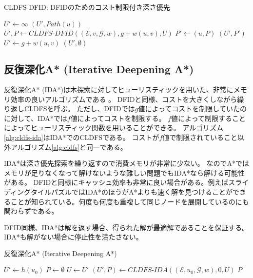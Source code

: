 \begin{algorithm}
\caption{CLDFS-DFID: DFIDのためのコスト制限付き深さ優先}
\label{alg:cldfs}
        $U' \leftarrow \infty$\;
	 {
		\Return $(U', Path(u))$\;
	}
	 {
		 {
			$U', P \leftarrow CLDFS\text{-}DFID((\mathcal{E}, v, \mathcal{G}, w), g + w(u, v), U)$\;
		   {
        $P' \leftarrow (u, P)$\;
		    \Return $(U', P')$\;
		  }
		}
     {
      $U' \leftarrow g + w(u, v)$\;
    }
	}
	\Return $(U', \emptyset)$\;
\end{algorithm}


\subsection{反復深化A* (Iterative Deepening A*)}
\label{sec:iterative-deepening-astar}


反復深化A* (IDA*)は木探索に対してヒューリスティックを用いた、非常にメモリ効率の良いアルゴリズムである \cite{korf:85a}。
DFIDと同様、コストを大きくしながら繰り返しCLDFSを呼ぶ。
ただし、DFIDでは$g$値によってコストを制限していたのに対して、IDA*では$f$値によってコストを制限する。
$f$値によって制限することによってヒューリスティック関数を用いることができる。
アルゴリズム\ref{alg:cldfs-ida}はIDA*でのCLDFSである。
コストが$f$値で制限されていること以外アルゴリズム\ref{alg:cldfs}と同一である。

IDA*は深さ優先探索を繰り返すので消費メモリが非常に少ない。
なのでA*ではメモリが足りなくなって解けないような難しい問題でもIDA*なら解ける可能性がある。
DFIDと同様にキャッシュ効率も非常に良い場合がある。例えばスライディングタイルパズルではIDA*のほうがA*よりも速く解を見つけることができることが知られている\cite{korf:85a}。何度も何度も重複して同じノードを展開しているのにも関わらずである。

DFID同様、IDA*は解を返す場合、得られた解が最適解であることを保証する。
IDA*も解がない場合に停止性を満たさない。

\begin{algorithm}
\caption{反復深化A* (Iterative Deepening A*)}
\label{alg:ida}
        $U' \leftarrow h(u_0)$\;
        $P \leftarrow \emptyset$\;
         {
          $U \leftarrow U'$\;
          $(U', P) \leftarrow CLDFS\text{-}IDA((\mathcal{E}, u_0, \mathcal{G}, w), 0, U)$\;
        }
        \Return $P$\;
\end{algorithm}

